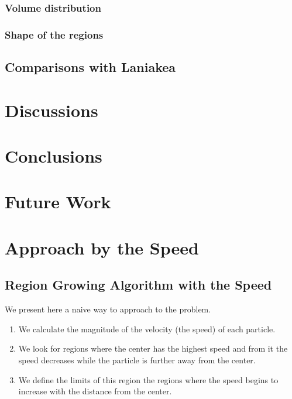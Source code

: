 \documentclass[12pt]{article}
\begin{document}
\subsubsection{Volume distribution}

\subsubsection{Shape of the regions}

\subsection{Comparisons with Laniakea}

\section{Discussions}
\label{sec:discussions}

\section{Conclusions}

\section{Future Work}
\label{sec:future_work}







\appendix
\section{Approach by the Speed} \label{App:App_Speed}
\subsection{Region Growing Algorithm with the Speed}

We present here a naive way to approach to the problem. 
\begin{enumerate}
	\item We calculate the magnitude of the velocity (the speed) of each particle. 
	\item We look for regions where the center has the highest speed and from it the speed decreases while the particle is further away from the center. 
    \item We define the limits of this region the regions where the speed begins to increase with the distance from the center.
\end{enumerate}
\end{document}
